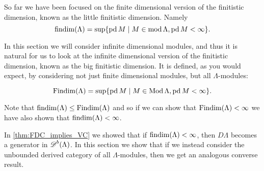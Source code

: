 
So far we have been focused on the finite dimensional version of the finitistic dimension, known as the little finitistic dimension. Namely 
$$\operatorname{findim}(\Lambda) = \sup\{\operatorname{pd} M \mid M \in \operatorname{mod}\Lambda, \operatorname{pd} M < \infty\}.$$

In this section we will consider infinite dimensional modules, and thus it is natural for us to look at the infinite dimensional version of the finitistic dimension, known as the big finitistic dimension. It is defined, as you would expect, by considering not just finite dimensional modules, but all $\Lambda$-modules:

$$\operatorname{Findim}(\Lambda) = \sup\{\operatorname{pd} M \mid M \in \operatorname{Mod}\Lambda, \operatorname{pd} M < \infty\}.$$

Note that $\operatorname{findim}(\Lambda) \leq \operatorname{Findim}(\Lambda)$ and so if we can show that $\operatorname{Findim}(\Lambda) < \infty$ we have also shown that $\operatorname{findim}(\Lambda) < \infty$.

In \cref{thm:FDC_implies_VC} we showed that if $\operatorname{findim}(\Lambda) < \infty$, then $D\Lambda$ becomes a generator in $\operatorname{\mathscr{D}}^b(\Lambda)$. In this section we show that if we instead consider the unbounded derived category of all $\Lambda$-modules, then we get an analogous converse result.

